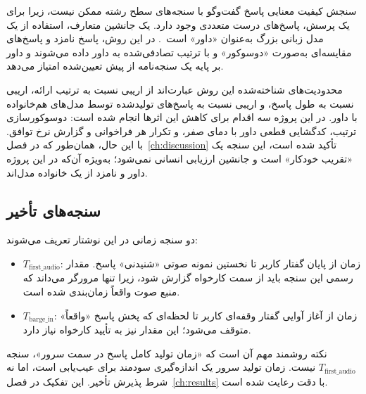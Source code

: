 سنجش کیفیت معنایی پاسخ گفت‌وگو با سنجه‌های سطح رشته ممکن نیست، زیرا برای
یک پرسش، پاسخ‌های درست متعددی وجود دارد. یک جانشین متعارف، استفاده از یک
مدل زبانی بزرگ به‌عنوان «داور» است~\cite{zheng2023mtbench}. در این
روش، پاسخ نامزد و پاسخ‌های مقایسه‌ای به‌صورت «دوسوکور» و با ترتیب
تصادفی‌شده به داور داده می‌شوند و داور بر پایه یک سنجه‌نامه از پیش تعیین‌شده
امتیاز می‌دهد.

محدودیت‌های شناخته‌شده این روش عبارت‌اند از اریبی نسبت به ترتیب ارائه، اریبی
نسبت به طول پاسخ، و اریبی نسبت به پاسخ‌های تولیدشده توسط مدل‌های هم‌خانواده
با داور. در این پروژه سه اقدام برای کاهش این اثرها انجام شده است:
دوسوکورسازی ترتیب، کدگشایی قطعی داور با دمای صفر، و تکرار هر فراخوانی و
گزارش نرخ توافق. با این حال، همان‌طور که در فصل~\ref{ch:discussion} تأکید
شده است، این سنجه یک «تقریب خودکار» است و جانشین ارزیابی انسانی
نمی‌شود؛ به‌ویژه آن‌که در این پروژه داور و نامزد از یک خانواده مدل‌اند.

\subsection{سنجه‌های تأخیر}
\label{sec:latency-prelim}

دو سنجه زمانی در این نوشتار تعریف می‌شوند:

\begin{itemize}
\item $T_{\text{first\_audio}}$: زمان از پایان گفتار کاربر تا نخستین نمونه
      صوتی «شنیدنی» پاسخ. مقدار رسمی این سنجه باید از سمت
      کارخواه گزارش شود، زیرا تنها مرورگر می‌داند که منبع صوت واقعاً
      زمان‌بندی شده است.
\item $T_{\text{barge\_in}}$: زمان از آغاز آوایی گفتار وقفه‌ای کاربر تا
      لحظه‌ای که پخش پاسخ «واقعاً» متوقف می‌شود؛ این مقدار نیز به تأیید
      کارخواه نیاز دارد.
\end{itemize}

نکته روشمند مهم آن است که «زمان تولید کامل پاسخ در سمت سرور»، سنجه
$T_{\text{first\_audio}}$ نیست. زمان تولید سرور یک اندازه‌گیری سودمند برای
عیب‌یابی است، اما نه شرط پذیرش تأخیر. این تفکیک در فصل~\ref{ch:results} با
دقت رعایت شده است.
